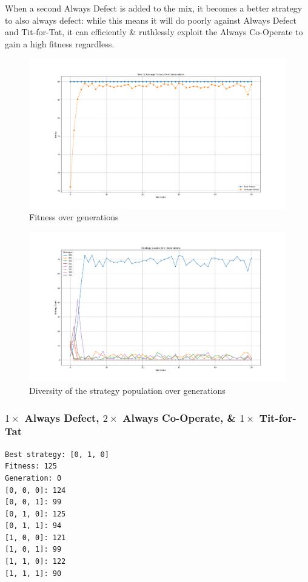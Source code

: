 \documentclass[a4paper]{article}
\newenvironment{code}{\captionsetup{type=listing}}{}
\begin{document}
When a second Always Defect is added to the mix, it becomes a better strategy to also always defect:
while this means it will do poorly against Always Defect and Tit-for-Tat, it can efficiently \& ruthlessly exploit the Always Co-Operate to gain a high fitness regardless.

\begin{figure}[H]
    \centering
    \includegraphics[width=\textwidth]{./images/defect_fitness.png}
    \caption{Fitness over generations}
\end{figure}

\begin{figure}[H]
    \centering
    \includegraphics[width=\textwidth]{./images/defect_strats.png}
    \caption{Diversity of the strategy population over generations}
\end{figure}

\subsubsection{$1 \times $ Always Defect, $2 \times$ Always Co-Operate, \& $1 \times$ Tit-for-Tat}
\begin{code}
\begin{verbatim}
Best strategy: [0, 1, 0]
Fitness: 125
Generation: 0
[0, 0, 0]: 124
[0, 0, 1]: 99
[0, 1, 0]: 125
[0, 1, 1]: 94
[1, 0, 0]: 121
[1, 0, 1]: 99
[1, 1, 0]: 122
[1, 1, 1]: 90
\end{verbatim}
\caption{$1 \times $ always defect, $2 \times$ always co-operate, \& $1 \times$ tit-for-tat}
\end{code}
\end{document}
